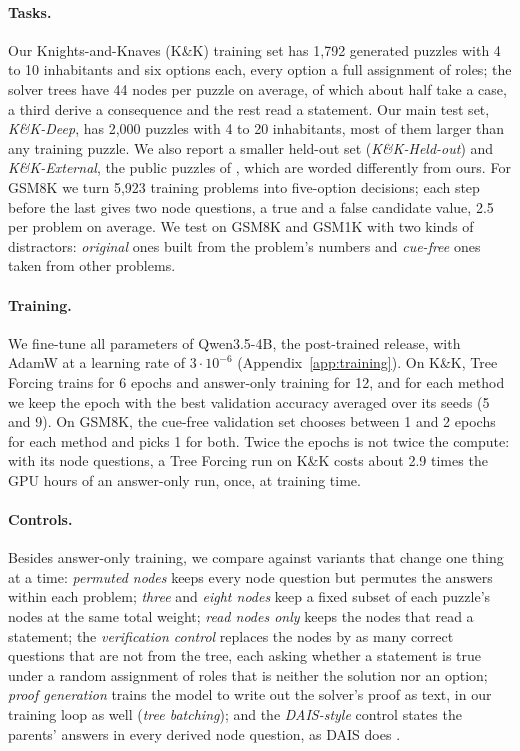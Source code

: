 \documentclass[10pt]{article}
\newcommand{\tf}{Tree Forcing}
\begin{document}
\paragraph{Tasks.} Our Knights-and-Knaves (K\&K) training set has 1,792 generated puzzles with 4 to 10 inhabitants and
six options each, every option a full assignment of roles; the solver trees have 44 nodes per puzzle on average, of
which about half take a case, a third derive a consequence and the rest read a statement. Our main test set,
\emph{K\&K-Deep}, has 2,000 puzzles with 4 to 20 inhabitants, most of them larger than any training puzzle. We also
report a smaller held-out set (\emph{K\&K-Held-out}) and \emph{K\&K-External}, the public puzzles of
\citet{xie2024kk}, which are worded differently from ours. For GSM8K we turn 5,923 training problems into five-option
decisions; each step before the last gives two node questions, a true and a false candidate value, 2.5 per problem
on average. We test on GSM8K and GSM1K \citep{zhang2024gsm1k} with two kinds of
distractors: \emph{original} ones built from the problem's numbers and \emph{cue-free} ones taken from other problems.

\paragraph{Training.} We fine-tune all parameters of Qwen3.5-4B, the post-trained release, with AdamW at a learning
rate of $3\cdot10^{-6}$ (Appendix~\ref{app:training}). On K\&K, \tf{} trains for 6 epochs and answer-only training for 12, and
for each method we keep the epoch with the best validation accuracy averaged over its seeds (5 and 9). On GSM8K, the
cue-free validation set chooses between 1 and 2 epochs for each method and picks 1 for both. Twice the epochs is not
twice the compute: with its node questions, a \tf{} run on K\&K costs about 2.9 times the GPU hours of an
answer-only run, once, at training time.

\paragraph{Controls.} Besides answer-only training, we compare against variants that change one thing at a time:
\emph{permuted nodes} keeps every node question but permutes the answers within each problem; \emph{three} and
\emph{eight nodes} keep a fixed subset of each puzzle's nodes at the same total weight; \emph{read nodes only} keeps
the nodes that read a statement; the \emph{verification control} replaces the nodes by as many correct questions that
are not from the tree, each asking whether a statement is true under a random assignment of roles that is neither the
solution nor an option; \emph{proof generation} trains the model to write out the solver's proof as text, in our
training loop as well (\emph{tree batching}); and the \emph{DAIS-style} control states the parents' answers in every
derived node question, as DAIS does \citep{dais2026}.
\end{document}

